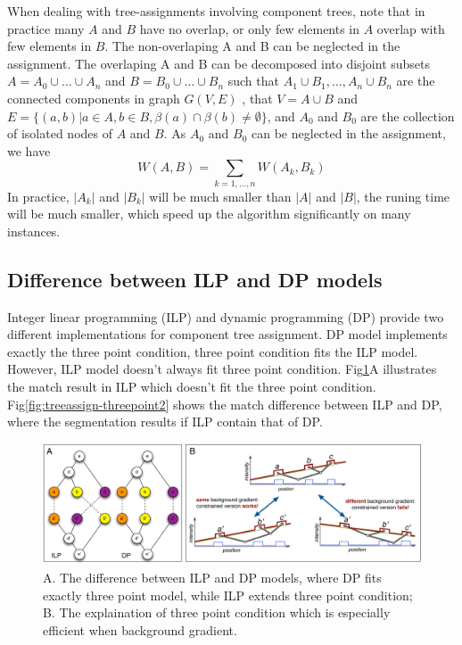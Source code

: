 When dealing with tree-assignments involving component trees, note that in practice many $A$ and $B$ have no overlap, or only few elements in $A$ overlap with few elements in $B$. The non-overlaping A and B can be neglected in the assignment. The overlaping A and B can be decomposed into disjoint subsets $A=A_0 \cup \ldots \cup A_n$ and $B = B_0 \cup \ldots \cup B_n$ such that $A_1 \cup B_1, \ldots, A_n \cup B_n$ are the connected components in graph $G(V, E)$ , that $V = A \cup B$ and $E = \{(a,b)|a \in A, b \in B, \beta(a) \cap \beta(b) \neq \emptyset\}$,  and $A_0$ and $B_0$ are the collection of isolated nodes of $A$ and $B$. As $A_0$ and $B_0$ can be neglected in the assignment, we have 
\begin{equation*} \label{eqn:ldcp-decomp}
W(A,B) = \sum_{k=1,\ldots,n}{W(A_k, B_k)}
\end{equation*}
In practice, $|A_k|$ and $|B_k|$ will be much smaller than $|A|$ and $|B|$, the runing time will be much smaller, which speed up the algorithm significantly on many instances.
\subsection{Difference between ILP and DP models}
Integer linear programming (ILP) and dynamic programming (DP) provide two different implementations for component tree assignment. DP model implements exactly the three point condition, three point condition fits the ILP model. However, ILP model doesn't always fit three point condition. Fig\ref{fig:treeassign-threepoint}A illustrates the match result in ILP which doesn't fit the three point condition. Fig\ref{fig:treeassign-threepoint2} shows the match difference between ILP and DP, where the segmentation results if ILP contain that of DP.

\begin{figure}[htbp]
\centering
\includegraphics[width=1.0\textwidth]{images/treeassign_threepoint}
\caption[Three point condition]{A. The difference between ILP and DP models, where DP fits exactly three point model, while ILP extends three point condition; B. The explaination of three point condition which is especially efficient when background gradient.}
\label{fig:treeassign-threepoint}
\end{figure}

